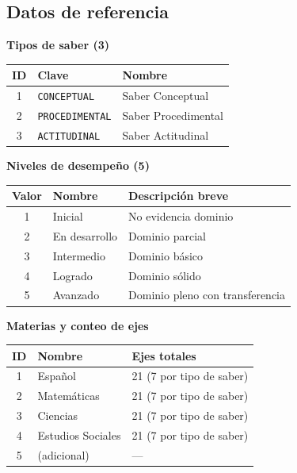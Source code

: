 \documentclass[11pt,a4paper,oneside]{article}
\newcommand{\code}[1]{\texttt{\small #1}}
\begin{document}
\subsection{Datos de referencia}

\textbf{Tipos de saber (3)}

\begin{table}[h]\centering\small
\begin{tabular}{@{}c l l@{}}
\toprule
\textbf{ID} & \textbf{Clave} & \textbf{Nombre} \\
\midrule
1 & \code{CONCEPTUAL}     & Saber Conceptual    \\
2 & \code{PROCEDIMENTAL}  & Saber Procedimental \\
3 & \code{ACTITUDINAL}    & Saber Actitudinal   \\
\bottomrule
\end{tabular}
\end{table}

\textbf{Niveles de desempeño (5)}

\begin{table}[h]\centering\small
\begin{tabular}{@{}c l l@{}}
\toprule
\textbf{Valor} & \textbf{Nombre} & \textbf{Descripción breve} \\
\midrule
1 & Inicial       & No evidencia dominio \\
2 & En desarrollo & Dominio parcial \\
3 & Intermedio    & Dominio básico \\
4 & Logrado       & Dominio sólido \\
5 & Avanzado      & Dominio pleno con transferencia \\
\bottomrule
\end{tabular}
\end{table}

\textbf{Materias y conteo de ejes}

\begin{table}[h]\centering\small
\begin{tabular}{@{}c l l@{}}
\toprule
\textbf{ID} & \textbf{Nombre} & \textbf{Ejes totales} \\
\midrule
1 & Español           & 21 (7 por tipo de saber) \\
2 & Matemáticas       & 21 (7 por tipo de saber) \\
3 & Ciencias          & 21 (7 por tipo de saber) \\
4 & Estudios Sociales & 21 (7 por tipo de saber) \\
5 & (adicional)       & --- \\
\bottomrule
\end{tabular}
\end{table}
\end{document}
